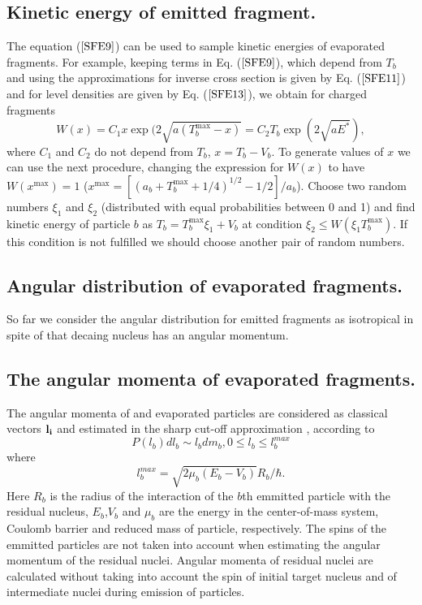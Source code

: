 \subsection{Kinetic energy of emitted fragment.}

\hspace{1.0em}The equation ($\ref{SFE9}$) can be used to sample kinetic
energies of evaporated fragments. 
 For example, keeping terms in Eq. ($\ref{SFE9}$),
which depend from $T_b$ and using the approximations for inverse cross
section is given by Eq. ($\ref{SFE11}$) and for level densities are given
by Eq. ($\ref{SFE13}$), we obtain for charged fragments
\begin{equation}
\label{SFE20}W(x)=C_1 x\exp (2\sqrt{a(T_b^{\max }-x)}= C_2 
T_b\exp (2\sqrt{aE^{*}}), 
\end{equation}
where $C_1$ and $C_2$ do not depend from $T_b$, $x=T_b-V_b$. To generate
values of $x$ we can use the next procedure, changing the expression for
$W(x)$ to have $W(x^{\max })=1$ ($x^{\max }=[(a_b+T_b^{\max
}+1/4)^{1/2}-1/2]/a_b$). Choose two random numbers $\xi _1$ and $\xi _2$
(distributed with equal probabilities between 0 and 1) and find kinetic
energy of particle $b$ as $T_b=T_b^{\max }\xi _1+V_b$ at condition $\xi
_2\leq W(\xi _1T_b^{\max })$. If this condition is not fulfilled we
should choose another pair of random numbers.


\subsection{Angular distribution of evaporated fragments.}

\hspace{1.0em}So far we consider the angular distribution for emitted 
fragments as
isotropical in spite of that decaing nucleus has an angular momentum.

\subsection{The angular momenta of 
evaporated fragments.} 
\hspace{1.0em} The angular momenta of and evaporated particles
are considered as classical vectors ${\bf l_i}$ and estimated in the sharp
cut-off approximation \cite{IT69}, \cite{IT73} according to 
\begin{equation}
\label{SF21}P(l_b)dl_b \sim l_bdm_b, 0 \leq l_b \leq l_b^{max}
\end{equation}
where
\begin{equation}
\label{SF22} l_b^{max}=\sqrt{2\mu_b(E_b - V_b)}R_b/\hbar.
\end{equation}
Here $R_b$ is the radius of the interaction of the $b$th 
emmitted particle with the 
residual nucleus, $E_b$,$V_b$ and $\mu_b$ are the energy 
in the center-of-mass system,
Coulomb barrier and reduced mass of particle, respectively. 
The spins of the emmitted 
particles are not taken into account when estimating the 
angular momentum of the
residual nuclei. 
Angular momenta of residual nuclei are calculated 
without taking into
account the spin of initial target nucleus and of 
intermediate nuclei during emission
of particles.

